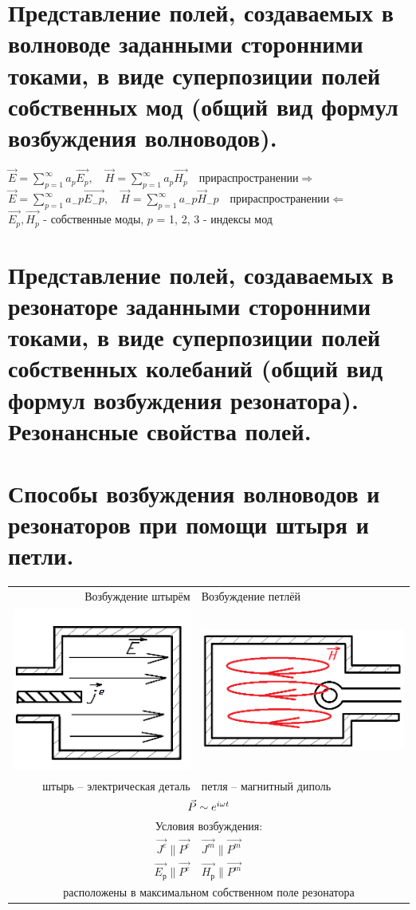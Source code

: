 \begin{multicols*}{2}
		\section{Представление полей, создаваемых в волноводе заданными сторонними токами, в виде суперпозиции полей собственных мод (общий вид формул возбуждения волноводов).}

		$\vec{E} = \sum\limits_{p = 1}^{\infty} a_p\vec{E_p}, \quad \vec{H} = \sum\limits_{p = 1}^{\infty} a_p\vec{H_p} \quad при распространении \Longrightarrow $\\
		$\vec{E} = \sum\limits_{p = 1}^{\infty} a_-p\vec{E_-p}, \quad \vec{H} = \sum\limits_{p = 1}^{\infty} a_-p\vec{H}_-p \quad при распространении \Longleftarrow $\\
		$\vec{E_p}, \vec{H_p}$ - собственные моды, \quad $p$ = 1, 2, 3 - индексы мод
		
		\section{Представление полей, создаваемых в резонаторе заданными сторонними токами, в виде суперпозиции полей собственных колебаний (общий вид формул возбуждения резонатора). Резонансные свойства полей. }
		
		\section{Способы возбуждения волноводов и резонаторов при помощи штыря и петли.}
		
		\begin{tabular}{r || l}
			{Возбуждение штырём} & {Возбуждение петлёй} \\
			\includegraphics[width=0.25\linewidth]{aed_imgs/ask15_1} &
			\includegraphics[width=0.25\linewidth]{aed_imgs/ask15_2} \\
			{штырь – электрическая деталь} & {петля – магнитный диполь} \\
			\multicolumn{2}{c}{$\vec{P}\sim e^{i\omega t}$} \\
			\multicolumn{2}{c}{Условия возбуждения:} \\
			{$\vec{J^e} \parallel\vec{P^e}$} & {$\vec{J^m} \parallel\vec{P^m}$} \\
			{$\vec{E_\text{р}} \parallel\vec{P^e}$} & {$\vec{H_\text{р}}\parallel\vec{P^m}$} \\
			\multicolumn{2}{c}{расположены в максимальном собственном поле резонатора} \\
		\end{tabular}
		

\end{multicols*}

